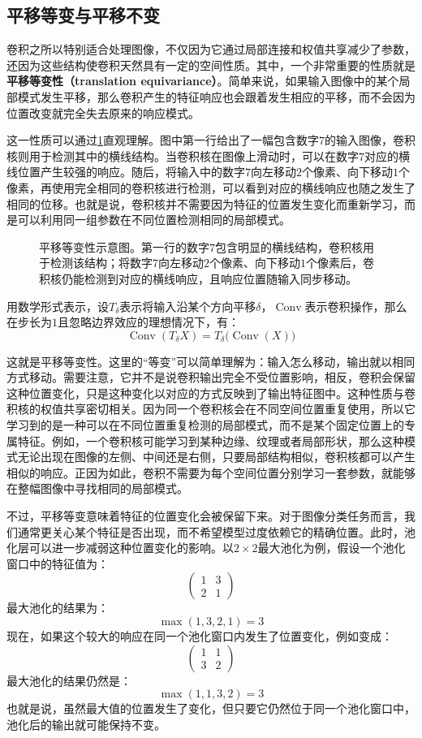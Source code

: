 \subsection{平移等变与平移不变}

卷积之所以特别适合处理图像，不仅因为它通过局部连接和权值共享减少了参数，还因为这些结构使卷积天然具有一定的空间性质。其中，一个非常重要的性质就是\textbf{平移等变性（translation equivariance）}。简单来说，如果输入图像中的某个局部模式发生平移，那么卷积产生的特征响应也会跟着发生相应的平移，而不会因为位置改变就完全失去原来的响应模式。

这一性质可以通过\cref{fig:translation_equivariance}直观理解。图中第一行给出了一幅包含数字$7$的输入图像，卷积核则用于检测其中的横线结构。当卷积核在图像上滑动时，可以在数字$7$对应的横线位置产生较强的响应。随后，将输入中的数字$7$向左移动$2$个像素、向下移动$1$个像素，再使用完全相同的卷积核进行检测，可以看到对应的横线响应也随之发生了相同的位移。也就是说，卷积核并不需要因为特征的位置发生变化而重新学习，而是可以利用同一组参数在不同位置检测相同的局部模式。

\begin{figure}[H]
    \caption{平移等变性示意图。第一行的数字$7$包含明显的横线结构，卷积核用于检测该结构；将数字$7$向左移动$2$个像素、向下移动$1$个像素后，卷积核仍能检测到对应的横线响应，且响应位置随输入同步移动。}
    \label{fig:translation_equivariance}
\end{figure}

用数学形式表示，设$T_\delta$表示将输入沿某个方向平移$\delta$，$\operatorname{Conv}$表示卷积操作，那么在步长为$1$且忽略边界效应的理想情况下，有：
$$
\operatorname{Conv}(T_\delta X)=T_\delta\bigl(\operatorname{Conv}(X)\bigr)
$$

这就是平移等变性。这里的“等变”可以简单理解为：输入怎么移动，输出就以相同方式移动。需要注意，它并不是说卷积输出完全不受位置影响，相反，卷积会保留这种位置变化，只是这种变化以对应的方式反映到了输出特征图中。这种性质与卷积核的权值共享密切相关。因为同一个卷积核会在不同空间位置重复使用，所以它学习到的是一种可以在不同位置重复检测的局部模式，而不是某个固定位置上的专属特征。例如，一个卷积核可能学习到某种边缘、纹理或者局部形状，那么这种模式无论出现在图像的左侧、中间还是右侧，只要局部结构相似，卷积核都可以产生相似的响应。正因为如此，卷积不需要为每个空间位置分别学习一套参数，就能够在整幅图像中寻找相同的局部模式。

不过，平移等变意味着特征的位置变化会被保留下来。对于图像分类任务而言，我们通常更关心某个特征是否出现，而不希望模型过度依赖它的精确位置。此时，池化层可以进一步减弱这种位置变化的影响。以$2\times2$最大池化为例，假设一个池化窗口中的特征值为：
$$
\begin{pmatrix}
1&3\\
2&1
\end{pmatrix}
$$
最大池化的结果为：
$$
\max(1,3,2,1)=3
$$
现在，如果这个较大的响应在同一个池化窗口内发生了位置变化，例如变成：
$$
\begin{pmatrix}
1&1\\
3&2
\end{pmatrix}
$$
最大池化的结果仍然是：
$$
\max(1,1,3,2)=3
$$
也就是说，虽然最大值的位置发生了变化，但只要它仍然位于同一个池化窗口中，池化后的输出就可能保持不变。

